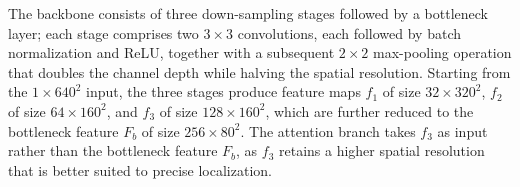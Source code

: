 \documentclass[lettersize,journal]{IEEEtran}
\begin{document}
The backbone consists of three down-sampling stages followed by a bottleneck layer; 
each stage comprises two $3\times3$ convolutions, 
each followed by batch normalization and ReLU, 
together with a subsequent $2\times2$ max-pooling operation 
that doubles the channel depth while halving the spatial resolution.
Starting from the $1\times640^2$ input, 
the three stages produce feature maps $f_1$ of size $32\times320^2$, $f_2$ of size $64\times160^2$, 
and $f_3$ of size $128\times160^2$, which are further reduced to the bottleneck feature $F_b$ of size $256\times80^2$.
The attention branch takes $f_3$ as input rather than the bottleneck feature $F_b$, 
as $f_3$ retains a higher spatial resolution that is better suited to precise localization.


\end{document}
